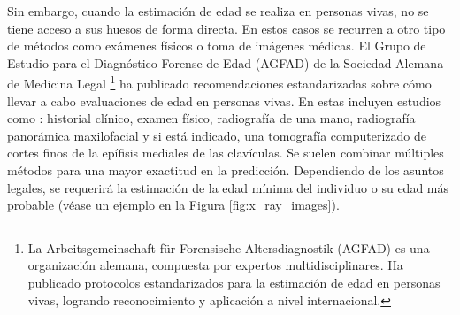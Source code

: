 Sin embargo, cuando la estimación de edad se realiza en personas vivas, no se tiene acceso a sus huesos de 
forma directa.
En estos casos se recurren a otro tipo de métodos como exámenes físicos o toma de imágenes médicas.
El Grupo de Estudio para el Diagnóstico Forense de Edad (AGFAD) de la Sociedad Alemana de Medicina Legal
\footnote{
    La Arbeitsgemeinschaft für Forensische Altersdiagnostik (AGFAD) es una organización alemana, compuesta 
    por expertos multidisciplinares. Ha publicado protocolos estandarizados para la estimación de edad en 
    personas vivas, logrando reconocimiento y aplicación a nivel internacional.
} 
ha publicado recomendaciones estandarizadas sobre cómo llevar a cabo evaluaciones de edad en personas vivas.
En estas incluyen estudios como \cite{schmeling2016}: historial clínico, examen físico, radiografía de una 
mano, radiografía panorámica maxilofacial y si está indicado, una tomografía computerizado de cortes finos de 
la epífisis mediales de las clavículas. Se suelen combinar múltiples métodos para una mayor exactitud en la 
predicción. Dependiendo de los asuntos legales, se requerirá la estimación de la edad mínima del individuo o 
su edad más probable \cite{schmeling2016} (véase un ejemplo en la Figura \ref{fig:x_ray_images}). 

